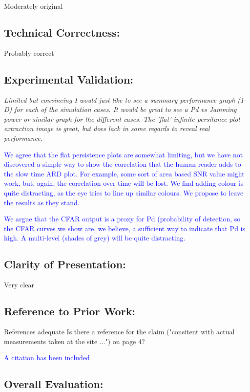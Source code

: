 \documentclass[11pt]{amsart}
\begin{document}
 Moderately original

\subsection{Technical Correctness:}

 Probably correct

\subsection{Experimental Validation:}

\emph{ Limited but convincing I would just like to see a summary performance graph (1-D) for each of the simulation cases. It would be great to see a Pd vs Jamming power or similar graph for the different cases. The 'flat' infinite persitance plot extraction image is great, but does lack in some regards to reveal real performance.}

\textcolor{blue}{
We agree that the flat persistence plots are somewhat limiting, but we have not discovered a simple way to show the correlation that the human reader adds to the slow time ARD plot. For example, some sort of area based SNR value might work, but, again, the correlation over time will be lost. We find adding colour is quite distracting, as the eye tries to line up similar colours. We propose to leave the results as they stand.}

\textcolor{blue}{We argue that the CFAR output is a proxy for Pd (probability of detection, so the CFAR curves we show are, we believe, a sufficient way to indicate that Pd is high. A multi-level (shades of grey) will be quite distracting.}

\subsection{Clarity of Presentation:}

 Very clear

\subsection{Reference to Prior Work: }

References adequate Is there a reference for the claim ("consitent with actual measurements taken at the site ...") on page 4?

\textcolor{blue}{A citation has been included}

\subsection{Overall Evaluation: }
\end{document}
